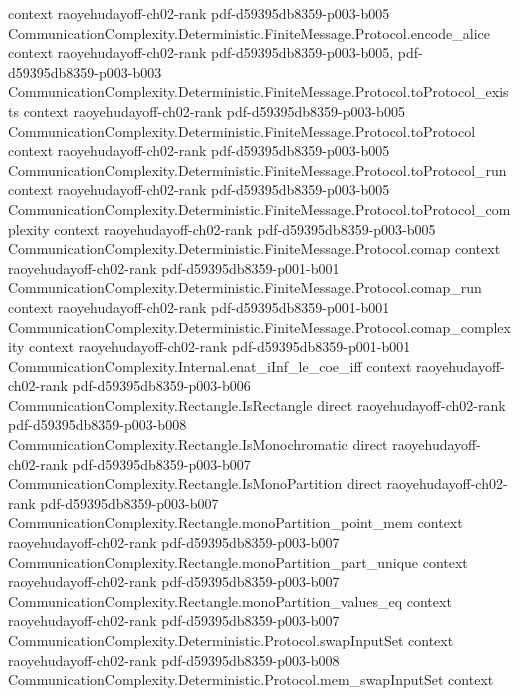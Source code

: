 \begin{theorem}
  {context}
  {raoyehudayoff-ch02-rank}
  {pdf-d59395db8359-p003-b005}
\proofstep
  {CommunicationComplexity.Deterministic.FiniteMessage.Protocol.encode_alice}
  {context}
  {raoyehudayoff-ch02-rank}
  {pdf-d59395db8359-p003-b005,
    pdf-d59395db8359-p003-b003}
\proofstep
  {CommunicationComplexity.Deterministic.FiniteMessage.Protocol.toProtocol_exists}
  {context}
  {raoyehudayoff-ch02-rank}
  {pdf-d59395db8359-p003-b005}
\proofstep
  {CommunicationComplexity.Deterministic.FiniteMessage.Protocol.toProtocol}
  {context}
  {raoyehudayoff-ch02-rank}
  {pdf-d59395db8359-p003-b005}
\proofstep
  {CommunicationComplexity.Deterministic.FiniteMessage.Protocol.toProtocol_run}
  {context}
  {raoyehudayoff-ch02-rank}
  {pdf-d59395db8359-p003-b005}
\proofstep
  {CommunicationComplexity.Deterministic.FiniteMessage.Protocol.toProtocol_complexity}
  {context}
  {raoyehudayoff-ch02-rank}
  {pdf-d59395db8359-p003-b005}
\proofstep
  {CommunicationComplexity.Deterministic.FiniteMessage.Protocol.comap}
  {context}
  {raoyehudayoff-ch02-rank}
  {pdf-d59395db8359-p001-b001}
\proofstep
  {CommunicationComplexity.Deterministic.FiniteMessage.Protocol.comap_run}
  {context}
  {raoyehudayoff-ch02-rank}
  {pdf-d59395db8359-p001-b001}
\proofstep
  {CommunicationComplexity.Deterministic.FiniteMessage.Protocol.comap_complexity}
  {context}
  {raoyehudayoff-ch02-rank}
  {pdf-d59395db8359-p001-b001}
\proofstep
  {CommunicationComplexity.Internal.enat_iInf_le_coe_iff}
  {context}
  {raoyehudayoff-ch02-rank}
  {pdf-d59395db8359-p003-b006}
\proofstep
  {CommunicationComplexity.Rectangle.IsRectangle}
  {direct}
  {raoyehudayoff-ch02-rank}
  {pdf-d59395db8359-p003-b008}
\proofstep
  {CommunicationComplexity.Rectangle.IsMonochromatic}
  {direct}
  {raoyehudayoff-ch02-rank}
  {pdf-d59395db8359-p003-b007}
\proofstep
  {CommunicationComplexity.Rectangle.IsMonoPartition}
  {direct}
  {raoyehudayoff-ch02-rank}
  {pdf-d59395db8359-p003-b007}
\proofstep
  {CommunicationComplexity.Rectangle.monoPartition_point_mem}
  {context}
  {raoyehudayoff-ch02-rank}
  {pdf-d59395db8359-p003-b007}
\proofstep
  {CommunicationComplexity.Rectangle.monoPartition_part_unique}
  {context}
  {raoyehudayoff-ch02-rank}
  {pdf-d59395db8359-p003-b007}
\proofstep
  {CommunicationComplexity.Rectangle.monoPartition_values_eq}
  {context}
  {raoyehudayoff-ch02-rank}
  {pdf-d59395db8359-p003-b007}
\proofstep
  {CommunicationComplexity.Deterministic.Protocol.swapInputSet}
  {context}
  {raoyehudayoff-ch02-rank}
  {pdf-d59395db8359-p003-b008}
\proofstep
  {CommunicationComplexity.Deterministic.Protocol.mem_swapInputSet}
  {context}

\end{theorem}
